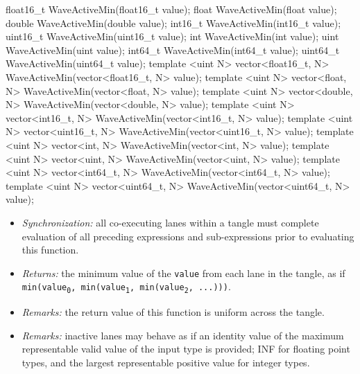 \begin{HLSL}
float16_t WaveActiveMin(float16_t value);
float WaveActiveMin(float value);
double WaveActiveMin(double value);
int16_t WaveActiveMin(int16_t value);
uint16_t WaveActiveMin(uint16_t value);
int WaveActiveMin(int value);
uint WaveActiveMin(uint value);
int64_t WaveActiveMin(int64_t value);
uint64_t WaveActiveMin(uint64_t value);
template <uint N> vector<float16_t, N> WaveActiveMin(vector<float16_t, N> value);
template <uint N> vector<float, N> WaveActiveMin(vector<float, N> value);
template <uint N> vector<double, N> WaveActiveMin(vector<double, N> value);
template <uint N> vector<int16_t, N> WaveActiveMin(vector<int16_t, N> value);
template <uint N> vector<uint16_t, N> WaveActiveMin(vector<uint16_t, N> value);
template <uint N> vector<int, N> WaveActiveMin(vector<int, N> value);
template <uint N> vector<uint, N> WaveActiveMin(vector<uint, N> value);
template <uint N> vector<int64_t, N> WaveActiveMin(vector<int64_t, N> value);
template <uint N> vector<uint64_t, N> WaveActiveMin(vector<uint64_t, N> value);
\end{HLSL}

\begin{itemize}
  \item \textit{Synchronization:} all co-executing \gls{lane}s within a \gls{tangle}
  must complete evaluation of all preceding expressions and sub-expressions
  prior to evaluating this function.
  \item \textit{Returns:} the minimum value of the \texttt{value} from each
  \gls{lane} in the \gls{tangle}, as if \texttt{min(value\textsubscript{0},
  min(value\textsubscript{1}, min(value\textsubscript{2}, ...)))}.
  \item \textit{Remarks:} the return value of this function is uniform across
  the \gls{tangle}.
  \item \textit{Remarks:} inactive \gls{lane}s may behave as if an identity
  value of the maximum representable valid value of the input type is provided;
  INF for floating point types, and the largest representable positive value
  for integer types.
\end{itemize}

